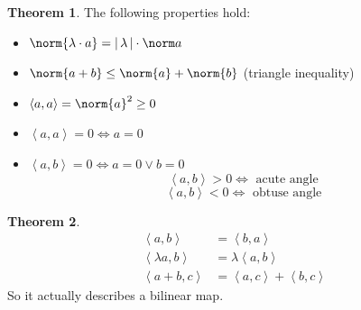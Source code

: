 \documentclass[a4paper,landscape,twocolumn]{article}
\newcommand\abs[1]{|\,#1\,|}
\newcommand\functional[1]{\left\langle{#1}\right\rangle}
\theoremstyle{definition}
\newtheorem{theorem}{Theorem}
\DeclarePairedDelimiter\norm\lVert\rVert
\begin{document}
\begin{theorem}
  \label{prop-8.2}
  The following properties hold:
  \begin{itemize}
    \item $\norm{\lambda \cdot a} = \abs{\lambda} \cdot \norm a$
    \item $\norm{a + b} \leq \norm{a} + \norm{b}$ (triangle inequality)
    \item $\functional{a,a} = \norm{a}^2 \geq 0$
    \item $\functional{a,a} = 0 \Leftrightarrow a = 0$
    \item $\functional{a,b} = 0 \Leftrightarrow a = 0 \lor b = 0$
      \[ \functional{a,b} > 0 \Leftrightarrow \text{ acute angle } \]
      \[ \functional{a,b} < 0 \Leftrightarrow \text{ obtuse angle } \]
  \end{itemize}
\end{theorem}

\begin{theorem}
  \label{satz-8.3}
  \begin{align}
    \functional{a,b} &= \functional{b,a} \\
    \functional{\lambda a,b} &= \lambda \functional{a,b} \\
    \functional{a+b,c} &= \functional{a,c} + \functional{b,c}
  \end{align}
  So it actually describes a bilinear map.
\end{theorem}
\end{document}
